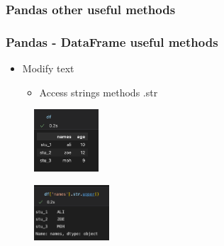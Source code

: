 \subsubsection{Pandas other useful methods}


\begin{frame}\frametitle{Pandas - DataFrame useful methods}
   \begin{minipage}{0.58\linewidth}
      \begin{itemize}
         \item Modify text
         \begin{itemize}
            \item Access strings methods .str
         \end{itemize}
      \end{itemize}
      \vspace{.5cm}
      \begin{figure}[H]
         \includegraphics[width=2.4cm]{../images/illustrations/pandas_df_ex.png}
      \end{figure}
   \end{minipage}
   \begin{minipage}{0.38\linewidth}
      \begin{figure}[H]
         \includegraphics[width=2.8cm]{../images/illustrations/pandas_str.png}
      \end{figure}
   \end{minipage}
\end{frame}


